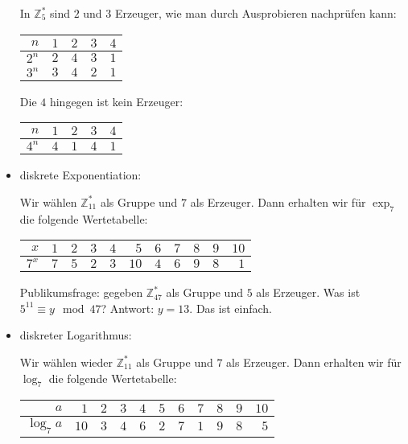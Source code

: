 \documentclass[
  a4paper,
  11pt,
]{article}
\newcommand{\Z}{\mathbb{Z}}
\begin{document}
\begin{itemize}
    In $\Z_5^*$ sind $2$ und $3$ Erzeuger, wie man durch Ausprobieren nachprüfen
    kann:
    \begin{center}
      \begin{tabular}{r|rrrr}
        $n$   & $1$ & $2$ & $3$ & $4$\\\hline
        $2^n$ & $2$ & $4$ & $3$ & $1$\\
        $3^n$ & $3$ & $4$ & $2$ & $1$
      \end{tabular}
    \end{center}
    Die $4$ hingegen ist kein Erzeuger:
    \begin{center}
      \begin{tabular}{r|rrrr}
        $n$   & $1$ & $2$ & $3$ & $4$\\\hline
        $4^n$ & $4$ & $1$ & $4$ & $1$
      \end{tabular}
    \end{center}

  \item diskrete Exponentiation:

    Wir wählen $\Z_{11}^*$ als Gruppe und $7$ als Erzeuger. Dann erhalten wir
    für $\exp_7$ die folgende Wertetabelle:
    \begin{center}
      \begin{tabular}{r|rrrrrrrrrr}
        $x$ & $1$ & $2$ & $3$ & $4$ & $5$ & $6$ & $7$ & $8$ & $9$ & $10$\\\hline
        $7^x$ & $7$ & $5$ & $2$ & $3$ & $10$ & $4$ & $6$ & $9$ & $8$ & $1$
      \end{tabular}
    \end{center}

    Publikumsfrage: gegeben $\Z_{47}^*$ als Gruppe und $5$ als Erzeuger. Was ist
    $5^{11} \equiv y \mod 47$? Antwort: $y = 13$. Das ist einfach.

  \item diskreter Logarithmus:

    Wir wählen wieder $\Z_{11}^*$ als Gruppe und $7$ als Erzeuger. Dann erhalten
    wir für $\log_7$ die folgende Wertetabelle:
    \begin{center}
      \begin{tabular}{r|rrrrrrrrrr}
        $a$ & $1$ & $2$ & $3$ & $4$ & $5$ & $6$ & $7$ & $8$ & $9$ & $10$\\\hline
        $\log_7 a$ & $10$ & $3$ & $4$ & $6$ & $2$ & $7$ & $1$ & $9$ & $8$ & $5$
      \end{tabular}
    \end{center}


\end{itemize}
\end{document}
